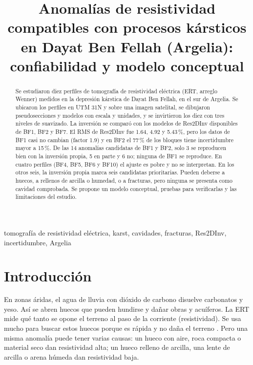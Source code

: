 \documentclass[conference]{IEEEtran}
\begin{document}
\renewcommand{\IEEEkeywordsname}{Palabras clave}

\title{Anomal\'ias de resistividad compatibles con procesos k\'arsticos en Dayat Ben Fellah (Argelia): confiabilidad y modelo conceptual}

\author{
}

\maketitle

\begin{abstract}
Se estudiaron diez perfiles de tomograf\'ia de resistividad el\'ectrica (ERT, arreglo Wenner) medidos en la depresi\'on k\'arstica de Dayat Ben Fellah, en el sur de Argelia. Se ubicaron los perfiles en UTM 31N y sobre una imagen satelital, se dibujaron pseudosecciones y modelos con escala y unidades, y se invirtieron los diez con tres niveles de suavizado. La inversi\'on se compar\'o con los modelos de Res2DInv disponibles de BF1, BF2 y BF7. El RMS de Res2DInv fue 1.64, 4.92 y 5.43\,\%, pero los datos de BF1 casi no cambian (factor 1.9) y en BF2 el 77\,\% de los bloques tiene incertidumbre mayor a 15\,\%. De las 14 anomal\'ias candidatas de BF1 y BF2, solo 3 se reproducen bien con la inversi\'on propia, 5 en parte y 6 no; ninguna de BF1 se reproduce. En cuatro perfiles (BF4, BF5, BF6 y BF10) el ajuste es pobre y no se interpretan. En los otros seis, la inversi\'on propia marca seis candidatas prioritarias. Pueden deberse a huecos, a rellenos de arcilla o humedad, o a fracturas, pero ninguna se presenta como cavidad comprobada. Se propone un modelo conceptual, pruebas para verificarlas y las limitaciones del estudio.
\end{abstract}

\begin{IEEEkeywords}
tomograf\'ia de resistividad el\'ectrica, karst, cavidades, fracturas, Res2DInv, incertidumbre, Argelia
\end{IEEEkeywords}

\section{Introducci\'on}
En zonas \'aridas, el agua de lluvia con di\'oxido de carbono disuelve carbonatos y yeso. As\'i se abren huecos que pueden hundirse y da\~nar obras y acu\'iferos. La ERT mide qu\'e tanto se opone el terreno al paso de la corriente (resistividad). Se usa mucho para buscar estos huecos porque es r\'apida y no da\~na el terreno \cite{melouah2016,coskun2012,elkhammari2007}. Pero una misma anomal\'ia puede tener varias causas: un hueco con aire, roca compacta o material seco dan resistividad alta; un hueco relleno de arcilla, una lente de arcilla o arena h\'umeda dan resistividad baja.
\end{document}
